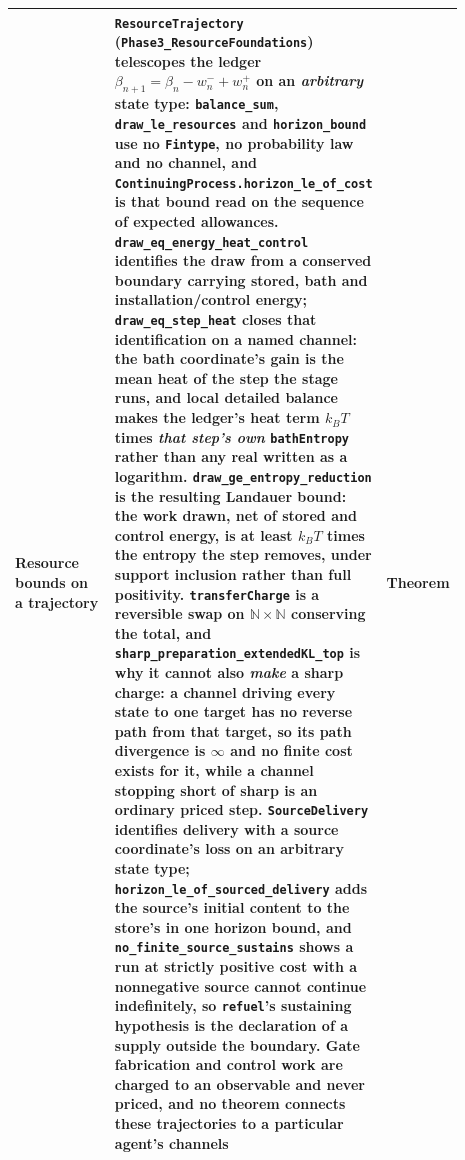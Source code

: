 \documentclass{article}
\begin{document}
\begin{longtable}{|>{\raggedright\arraybackslash}p{0.26\linewidth}|>{\raggedright\arraybackslash}p{0.46\linewidth}|>{\raggedright\arraybackslash}p{0.17\linewidth}|}
Resource bounds on a trajectory & \texttt{ResourceTrajectory} (\nolinkurl{Phase3_ResourceFoundations}) telescopes the ledger $\beta_{n+1}=\beta_n-w^-_n+w^+_n$ on an \emph{arbitrary} state type: \nolinkurl{balance_sum}, \nolinkurl{draw_le_resources} and \nolinkurl{horizon_bound} use no \texttt{Fintype}, no probability law and no channel, and \nolinkurl{ContinuingProcess.horizon_le_of_cost} is that bound read on the sequence of expected allowances. \nolinkurl{draw_eq_energy_heat_control} identifies the draw from a conserved boundary carrying stored, bath and installation/control energy; \nolinkurl{draw_eq_step_heat} closes that identification on a named channel: the bath coordinate's gain is the mean heat of the step the stage runs, and local detailed balance makes the ledger's heat term $k_BT$ times \emph{that step's own} \texttt{bathEntropy} rather than any real written as a logarithm. \nolinkurl{draw_ge_entropy_reduction} is the resulting Landauer bound: the work drawn, net of stored and control energy, is at least $k_BT$ times the entropy the step removes, under support inclusion rather than full positivity. \texttt{transferCharge} is a reversible swap on $\mathbb{N}\times\mathbb{N}$ conserving the total, and \nolinkurl{sharp_preparation_extendedKL_top} is why it cannot also \emph{make} a sharp charge: a channel driving every state to one target has no reverse path from that target, so its path divergence is $\infty$ and no finite cost exists for it, while a channel stopping short of sharp is an ordinary priced step. \texttt{SourceDelivery} identifies delivery with a source coordinate's loss on an arbitrary state type; \nolinkurl{horizon_le_of_sourced_delivery} adds the source's initial content to the store's in one horizon bound, and \nolinkurl{no_finite_source_sustains} shows a run at strictly positive cost with a nonnegative source cannot continue indefinitely, so \texttt{refuel}'s sustaining hypothesis is the declaration of a supply outside the boundary. Gate fabrication and control work are charged to an observable and never priced, and no theorem connects these trajectories to a particular agent's channels & Theorem \\ \hline

\end{longtable}
\end{document}
